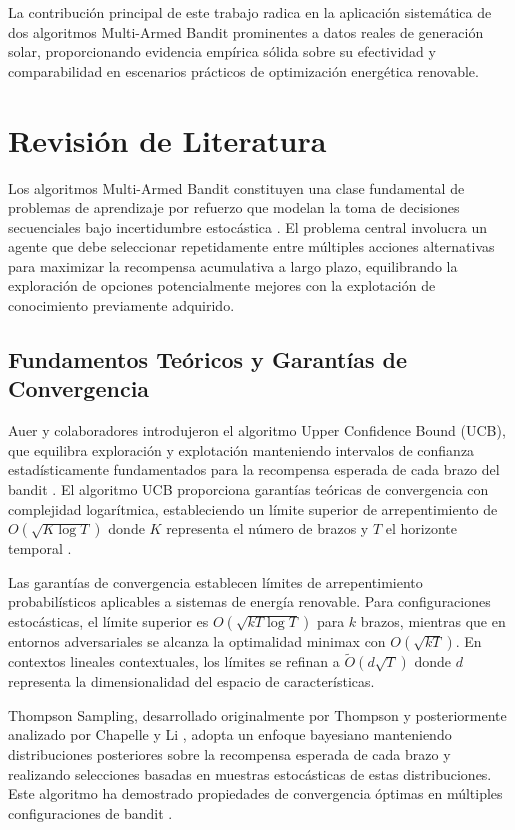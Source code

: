 \documentclass[conference]{IEEEtran}
\begin{document}
La contribución principal de este trabajo radica en la aplicación sistemática de dos algoritmos Multi-Armed Bandit prominentes a datos reales de generación solar, proporcionando evidencia empírica sólida sobre su efectividad y comparabilidad en escenarios prácticos de optimización energética renovable.

\section{Revisión de Literatura}

Los algoritmos Multi-Armed Bandit constituyen una clase fundamental de problemas de aprendizaje por refuerzo que modelan la toma de decisiones secuenciales bajo incertidumbre estocástica \cite{auer2002}. El problema central involucra un agente que debe seleccionar repetidamente entre múltiples acciones alternativas para maximizar la recompensa acumulativa a largo plazo, equilibrando la exploración de opciones potencialmente mejores con la explotación de conocimiento previamente adquirido.

\subsection{Fundamentos Teóricos y Garantías de Convergencia}

Auer y colaboradores introdujeron el algoritmo Upper Confidence Bound (UCB), que equilibra exploración y explotación manteniendo intervalos de confianza estadísticamente fundamentados para la recompensa esperada de cada brazo del bandit \cite{auer2002}. El algoritmo UCB proporciona garantías teóricas de convergencia con complejidad logarítmica, estableciendo un límite superior de arrepentimiento de $O(\sqrt{K \log T})$ donde $K$ representa el número de brazos y $T$ el horizonte temporal \cite{srinivas2021}.

Las garantías de convergencia establecen límites de arrepentimiento probabilísticos aplicables a sistemas de energía renovable. Para configuraciones estocásticas, el límite superior es $O(\sqrt{kT \log T})$ para $k$ brazos, mientras que en entornos adversariales se alcanza la optimalidad minimax con $O(\sqrt{kT})$. En contextos lineales contextuales, los límites se refinan a $\tilde{O}(d\sqrt{T})$ donde $d$ representa la dimensionalidad del espacio de características.

Thompson Sampling, desarrollado originalmente por Thompson \cite{thompson1933} y posteriormente analizado por Chapelle y Li \cite{chapelle2011}, adopta un enfoque bayesiano manteniendo distribuciones posteriores sobre la recompensa esperada de cada brazo y realizando selecciones basadas en muestras estocásticas de estas distribuciones. Este algoritmo ha demostrado propiedades de convergencia óptimas en múltiples configuraciones de bandit \cite{bouneffouf2019}.
\end{document}
